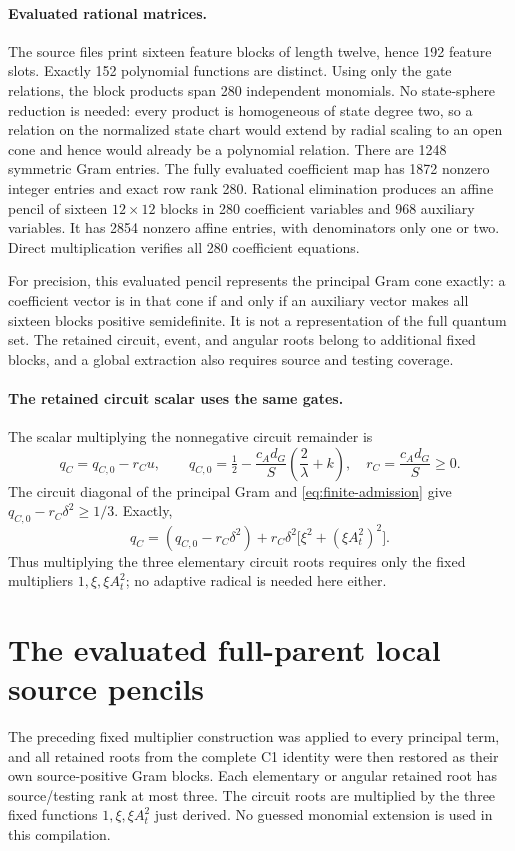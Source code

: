 \paragraph{Evaluated rational matrices.}
The source files print sixteen feature blocks of length twelve, hence
192 feature slots. Exactly 152 polynomial functions are distinct.
Using only the gate relations, the block products span 280 independent
monomials. No state-sphere reduction is needed: every product is
homogeneous of state degree two, so a relation on the normalized
state chart would extend by radial scaling to an open cone and hence
would already be a polynomial relation. There are 1248 symmetric Gram entries. The fully evaluated
coefficient map has 1872 nonzero integer entries and exact row rank
280. Rational elimination produces an affine pencil of sixteen
$12\times12$ blocks in 280 coefficient variables and 968 auxiliary
variables. It has 2854 nonzero affine entries, with denominators only
one or two. Direct multiplication verifies all 280 coefficient equations.

For precision, this evaluated pencil represents the principal Gram
cone exactly: a coefficient vector is in that cone if and only if an
auxiliary vector makes all sixteen blocks positive semidefinite.
It is not a representation of the full quantum set. The retained
circuit, event, and angular roots belong to additional fixed blocks,
and a global extraction also requires source and testing coverage.

\paragraph{The retained circuit scalar uses the same gates.}
The scalar multiplying the nonnegative circuit remainder is
\[
 q_C=q_{C,0}-r_Cu,\qquad
 q_{C,0}=\tfrac12-\frac{c_Ad_G}{S}\left(\frac2\lambda+k\right),
 \quad r_C=\frac{c_Ad_G}{S}\ge0.
\]
The circuit diagonal of the principal Gram and
\eqref{eq:finite-admission} give $q_{C,0}-r_C\delta^2\ge1/3$.
Exactly,
\[
 q_C=(q_{C,0}-r_C\delta^2)
             +r_C\delta^2\bigl[\xi^2+(\xi A_t^2)^2\bigr].
\]
Thus multiplying the three elementary circuit roots requires only the
fixed multipliers $1,\xi,\xi A_t^2$; no adaptive radical is needed here
either.


\section{The evaluated full-parent local source pencils}
The preceding fixed multiplier construction was applied to every
principal term, and all retained roots from the complete C1 identity
were then restored as their own source-positive Gram blocks.
Each elementary or angular retained root has source/testing rank at
most three. The circuit roots are multiplied by the three fixed
functions $1,\xi,\xi A_t^2$ just derived. No guessed monomial extension
is used in this compilation.


